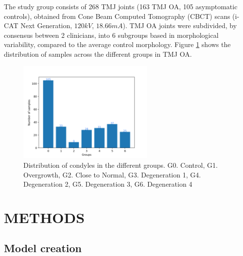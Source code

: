 \documentclass[]{spie}  %
\begin{document}
The study group consists of 268 TMJ joints (163 TMJ OA, 105 asymptomatic controls), obtained from Cone Beam Computed Tomography (CBCT) scans (i-CAT Next Generation, $120 kV$, $18.66 mA$). TMJ OA joints were subdivided, by consensus between 2 clinicians, into 6 subgroups based in morphological variability, compared to the average control morphology.
Figure \ref{fig:condylesHisto} shows the distribution of samples across the different groups in TMJ OA.
\begin{figure}[h]
\centering 
    \includegraphics[width=0.6\textwidth]{NumberSamplesCondyles.png}
    \caption{Distribution of condyles in the different groups. G0. Control, G1. Overgrowth, G2. Close to Normal, G3. Degeneration 1, G4. Degeneration 2, G5. Degeneration 3, G6. Degeneration 4}
    \label{fig:condylesHisto}
\end{figure} 

\section{METHODS} 

\subsection{Model creation}
\end{document}
